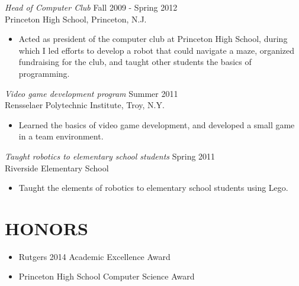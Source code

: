 \documentclass[margin]{res}
\begin{document}
\begin{resume}
{\sl Head of Computer Club} \hfill Fall 2009 - Spring 2012 \\
Princeton High School, Princeton, N.J.
\begin{itemize}  \itemsep -2pt
\item
Acted as president of the computer club at Princeton High School, during which I led efforts to develop a robot that could navigate a maze, organized fundraising for the club, and taught other students the basics of programming.
\end{itemize}

{\sl Video game development program} \hfill Summer 2011 \\
Rensselaer Polytechnic Institute, Troy, N.Y.
\begin{itemize}  \itemsep -2pt
\item
Learned the basics of video game development, and developed a small game in a team environment.
\end{itemize}

{\sl Taught robotics to elementary school students} \hfill Spring 2011 \\
Riverside Elementary School
\begin{itemize}  \itemsep -2pt
\item
Taught the elements of robotics to elementary school students using Lego.
\end{itemize}

\section{HONORS}
\begin{itemize} \itemsep -2pt
\item
Rutgers 2014 Academic Excellence Award
\item
Princeton High School Computer Science Award
\end{itemize} 

\end{resume}
\end{document}
